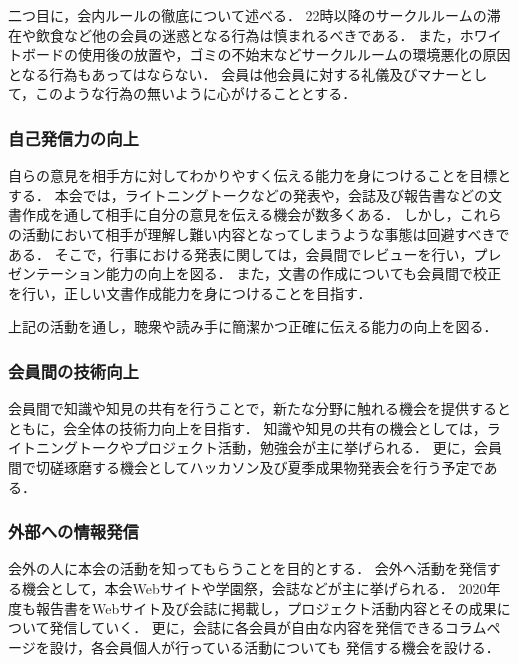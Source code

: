   二つ目に，会内ルールの徹底について述べる．
  22時以降のサークルルームの滞在や飲食など他の会員の迷惑となる行為は慎まれるべきである．
  また，ホワイトボードの使用後の放置や，ゴミの不始末などサークルルームの環境悪化の原因となる行為もあってはならない．
  会員は他会員に対する礼儀及びマナーとして，このような行為の無いように心がけることとする．
  
\subsubsection*{自己発信力の向上}
  自らの意見を相手方に対してわかりやすく伝える能力を身につけることを目標とする．
  本会では，ライトニングトークなどの発表や，会誌及び報告書などの文書作成を通して相手に自分の意見を伝える機会が数多くある．
  しかし，これらの活動において相手が理解し難い内容となってしまうような事態は回避すべきである．
  そこで，行事における発表に関しては，会員間でレビューを行い，プレゼンテーション能力の向上を図る．
  また，文書の作成についても会員間で校正を行い，正しい文書作成能力を身につけることを目指す．

  上記の活動を通し，聴衆や読み手に簡潔かつ正確に伝える能力の向上を図る．

\subsubsection*{会員間の技術向上}
  会員間で知識や知見の共有を行うことで，新たな分野に触れる機会を提供するとともに，会全体の技術力向上を目指す．
  知識や知見の共有の機会としては，ライトニングトークやプロジェクト活動，勉強会が主に挙げられる．
  更に，会員間で切磋琢磨する機会としてハッカソン及び夏季成果物発表会を行う予定である．

\subsubsection*{外部への情報発信}
  会外の人に本会の活動を知ってもらうことを目的とする．
  会外へ活動を発信する機会として，本会Webサイトや学園祭，会誌などが主に挙げられる．
  2020年度も報告書をWebサイト及び会誌に掲載し，プロジェクト活動内容とその成果について発信していく．
  更に，会誌に各会員が自由な内容を発信できるコラムページを設け，各会員個人が行っている活動についても
  発信する機会を設ける．

